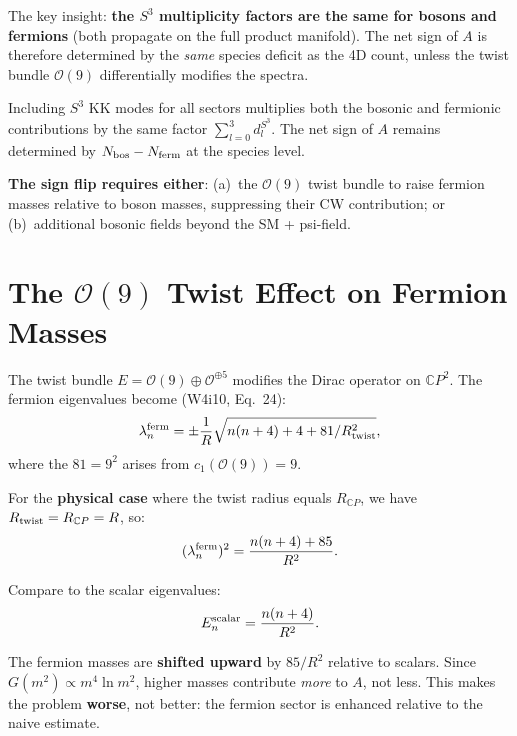 \documentclass[11pt,a4paper]{article}
\newcommand{\CP}{\mathbb{C}P}
\newcommand{\Nbos}{N_{\rm bos}}
\newcommand{\Nferm}{N_{\rm ferm}}
\newcounter{findingctr}
\newenvironment{finding}[1][]{%
  \refstepcounter{findingctr}%
  \begin{tcolorbox}[colback=blue!3!white, colframe=blue!50!black,
    title=\textbf{Finding \thefindingctr: #1}]
}{%
  \end{tcolorbox}%
}
\begin{document}
The key insight: \textbf{the $S^3$ multiplicity factors are the
same for bosons and fermions} (both propagate on the full
product manifold). The net sign of $A$ is therefore determined
by the \emph{same} species deficit as the 4D count, unless the
twist bundle $\mathcal{O}(9)$ differentially modifies the spectra.

\begin{finding}[$S^3$ Multiplicities Do Not Change the Sign of $A$ Alone]
\label{find:S3-cancel}
Including $S^3$ KK modes for all sectors multiplies both the
bosonic and fermionic contributions by the same factor
$\sum_{l=0}^3 d_l^{S^3}$. The net sign of $A$ remains determined
by $\Nbos - \Nferm$ at the species level.

\textbf{The sign flip requires either}: (a)~the $\mathcal{O}(9)$
twist bundle to raise fermion masses relative to boson masses,
suppressing their CW contribution; or (b)~additional bosonic
fields beyond the SM + psi-field.
\end{finding}


\section{The $\mathcal{O}(9)$ Twist Effect on Fermion Masses}
\label{sec:twist-effect}

The twist bundle $E = \mathcal{O}(9) \oplus \mathcal{O}^{\oplus 5}$
modifies the Dirac operator on $\CP^2$. The fermion eigenvalues
become (W4i10, Eq.~24):
\begin{equation}
\lambda_n^{\rm ferm} = \pm\frac{1}{R}\sqrt{n(n+4) + 4 + 81/R^2_{\rm twist}},
\end{equation}
where the $81 = 9^2$ arises from $c_1(\mathcal{O}(9)) = 9$.

For the \textbf{physical case} where the twist radius equals
$R_{\CP}$, we have $R_{\rm twist} = R_{\CP} = R$, so:
\begin{equation}
(\lambda_n^{\rm ferm})^2 = \frac{n(n+4) + 85}{R^2}.
\end{equation}

Compare to the scalar eigenvalues:
\begin{equation}
E_n^{\rm scalar} = \frac{n(n+4)}{R^2}.
\end{equation}

The fermion masses are \textbf{shifted upward} by $85/R^2$ relative
to scalars. Since $G(m^2) \propto m^4 \ln m^2$, higher masses
contribute \emph{more} to $A$, not less. This makes the problem
\textbf{worse}, not better: the fermion sector is enhanced relative
to the naive estimate.
\end{document}
